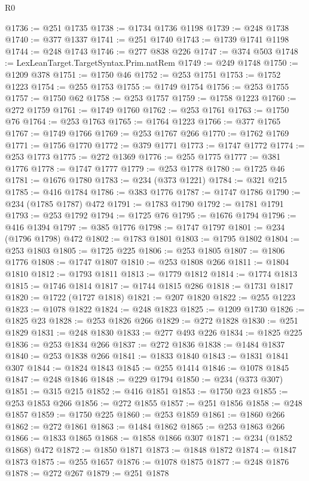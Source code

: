 \begin{lexlean}{R0}
\begin{coremodule}
@1736 := @251 @1735
@1738 := @1734 @1736 @1198
@1739 := @248 @1738
@1740 := @377 @1337
@1741 := @251 @1740
@1743 := @1739 @1741 @1198
@1744 := @248 @1743
@1746 := @277 @838 @226
@1747 := @374 @503
@1748 := LexLeanTarget.TargetSyntax.Prim.natRem
@1749 := @249 @1748
@1750 := @1209 @378
@1751 := @1750 @46
@1752 := @253 @1751
@1753 := @1752 @1223
@1754 := @255 @1753
@1755 := @1749 @1754
@1756 := @253 @1755
@1757 := @1750 @62
@1758 := @253 @1757
@1759 := @1758 @1223
@1760 := @272 @1759
@1761 := @1749 @1760
@1762 := @253 @1761
@1763 := @1750 @76
@1764 := @253 @1763
@1765 := @1764 @1223
@1766 := @377 @1765
@1767 := @1749 @1766
@1769 := @253 @1767 @266
@1770 := @1762 @1769
@1771 := @1756 @1770
@1772 := @379 @1771
@1773 := @1747 @1772
@1774 := @253 @1773
@1775 := @272 @1369
@1776 := @255 @1775
@1777 := @381 @1776
@1778 := @1747 @1777
@1779 := @253 @1778
@1780 := @1725 @46
@1781 := @1676 @1780
@1783 := @234 (@373 @1221)
@1784 := @321 @215
@1785 := @416 @1784
@1786 := @383 @1776
@1787 := @1747 @1786
@1790 := @234 (@1785 @1787) @472
@1791 := @1783 @1790
@1792 := @1781 @1791
@1793 := @253 @1792
@1794 := @1725 @76
@1795 := @1676 @1794
@1796 := @416 @1394
@1797 := @385 @1776
@1798 := @1747 @1797
@1801 := @234 (@1796 @1798) @472
@1802 := @1783 @1801
@1803 := @1795 @1802
@1804 := @253 @1803
@1805 := @1725 @225
@1806 := @253 @1805
@1807 := @1806 @1776
@1808 := @1747 @1807
@1810 := @253 @1808 @266
@1811 := @1804 @1810
@1812 := @1793 @1811
@1813 := @1779 @1812
@1814 := @1774 @1813
@1815 := @1746 @1814
@1817 := @1744 @1815 @286
@1818 := @1731 @1817
@1820 := @1722 (@1727 @1818)
@1821 := @207 @1820
@1822 := @255 @1223
@1823 := @1078 @1822
@1824 := @248 @1823
@1825 := @1209 @1730
@1826 := @1825 @23
@1828 := @253 @1826 @266
@1829 := @272 @1828
@1830 := @251 @1829
@1831 := @248 @1830
@1833 := @277 @493 @226
@1834 := @1825 @225
@1836 := @253 @1834 @266
@1837 := @272 @1836
@1838 := @1484 @1837
@1840 := @253 @1838 @266
@1841 := @1833 @1840
@1843 := @1831 @1841 @307
@1844 := @1824 @1843
@1845 := @255 @1414
@1846 := @1078 @1845
@1847 := @248 @1846
@1848 := @229 @1794
@1850 := @234 (@373 @307)
@1851 := @315 @215
@1852 := @416 @1851
@1853 := @1750 @23
@1855 := @253 @1853 @266
@1856 := @272 @1855
@1857 := @251 @1856
@1858 := @248 @1857
@1859 := @1750 @225
@1860 := @253 @1859
@1861 := @1860 @266
@1862 := @272 @1861
@1863 := @1484 @1862
@1865 := @253 @1863 @266
@1866 := @1833 @1865
@1868 := @1858 @1866 @307
@1871 := @234 (@1852 @1868) @472
@1872 := @1850 @1871
@1873 := @1848 @1872
@1874 := @1847 @1873
@1875 := @255 @1657
@1876 := @1078 @1875
@1877 := @248 @1876
@1878 := @272 @267
@1879 := @251 @1878

\end{coremodule}
\end{lexlean}
